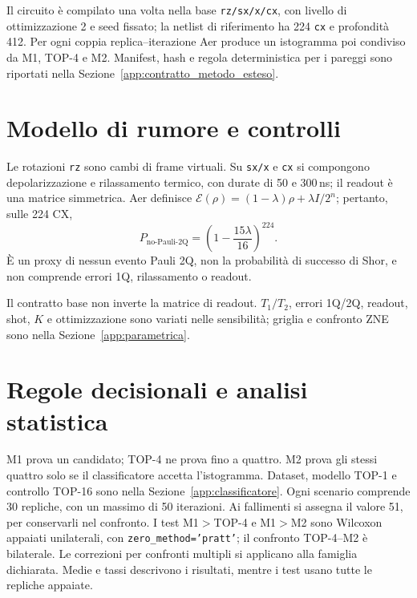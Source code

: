\begin{onehalfspace}
Il circuito è compilato una volta nella base \texttt{rz/sx/x/cx}, con livello
di ottimizzazione 2 e seed fissato; la netlist di riferimento ha
224 \texttt{cx} e profondità 412. Per ogni coppia replica--iterazione Aer
produce un istogramma poi condiviso da M1, TOP-4 e M2. Manifest, hash e regola
deterministica per i pareggi sono riportati nella
Sezione~\ref{app:contratto_metodo_esteso}.

\section{Modello di rumore e controlli}
\label{sec:mitigazione_scelte}
\label{subsec:transpilazione}
\label{subsec:noise_uniforme}

Le rotazioni \texttt{rz} sono cambi di frame virtuali. Su \texttt{sx/x} e
\texttt{cx} si compongono depolarizzazione e rilassamento termico, con durate
di 50 e 300\,ns; il readout è una matrice simmetrica. Aer definisce
$\mathcal E(\rho)=(1-\lambda)\rho+\lambda I/2^n$; pertanto, sulle 224 CX,
\begin{equation}
 P_{\mathrm{no\text{-}Pauli\text{-}2Q}}=
 \left(1-\frac{15\lambda}{16}\right)^{224}.
 \label{eq:proxy_no_pauli_2q}
\end{equation}
È un proxy di nessun evento Pauli 2Q, non la probabilità di successo di Shor,
e non comprende errori 1Q, rilassamento o readout.

\label{subsec:readout_mitigation}
Il contratto base non inverte la matrice di readout. $T_1/T_2$, errori 1Q/2Q,
readout, shot, $K$ e ottimizzazione sono variati nelle sensibilità; griglia e
confronto \ac{ZNE} sono nella Sezione~\ref{app:parametrica}.
\label{subsec:zne}
\label{subsec:sensitivity}

\section{Regole decisionali e analisi statistica}
\label{subsec:scelta_ml}
\label{sec:metodo1}
\label{sec:metodo2}

M1 prova un candidato; TOP-4 ne prova fino a quattro. M2 prova gli stessi quattro solo se il classificatore accetta l'istogramma. Dataset, modello TOP-1 e controllo TOP-16 sono nella Sezione~\ref{app:classificatore}. Ogni scenario comprende 30 repliche, con un massimo di 50 iterazioni. Ai fallimenti si assegna il valore 51, per conservarli nel confronto. I test M1$>$TOP-4 e M1$>$M2 sono Wilcoxon appaiati unilaterali, con \texttt{zero\_method='pratt'}; il confronto TOP-4--M2 è bilaterale. Le correzioni per confronti multipli si applicano alla famiglia dichiarata. Medie e tassi descrivono i risultati, mentre i test usano tutte le repliche appaiate.


\end{onehalfspace}
